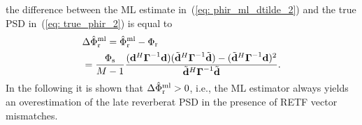 \documentclass[10pt]{IEEEtran}
\begin{document}
the difference between the ML estimate in~(\ref{eq: phir_ml_dtilde_2}) and the true PSD in~(\ref{eq: true_phir_2}) is equal to
\begin{align}
& \Delta\hat{\Phi}^{\rm ml}_{\rm r} = \hat{\Phi}^{\rm ml}_{\rm r} - \Phi_{\rm r} \\
\label{eq: delta_phi_ml}
& = \frac{\Phi_{\rm s}}{M-1} \frac{(\mathbf{d}^H\boldsymbol{\Gamma}^{-1}\mathbf{d}) (\tilde{\mathbf{d}}^H \boldsymbol{\Gamma}^{-1}\tilde{\mathbf{d}}) - ( \tilde{\mathbf{d}}^H \boldsymbol{\Gamma}^{-1}\mathbf{d})^2 } {\tilde{\mathbf{d}}^H\boldsymbol{\Gamma}^{-1}\tilde{\mathbf{d}}}.
\end{align}
In the following it is shown that $\Delta\hat{\Phi}^{\rm ml}_{\rm r} > 0$, i.e., the ML estimator always yields an overestimation of the late reverberat PSD in the presence of RETF vector mismatches.
\end{document}
